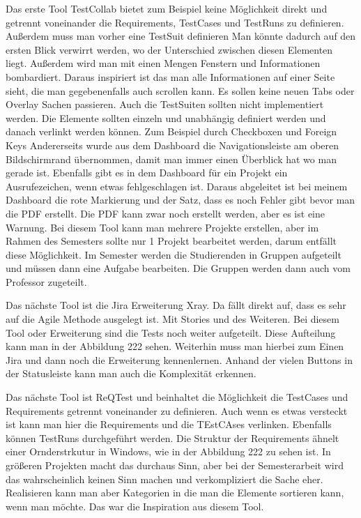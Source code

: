 \documentclass[11pt,a4paper]{report}
\begin{document}
Das erste Tool TestCollab bietet zum Beispiel keine Möglichkeit direkt und getrennt voneinander die Requirements, TestCases und TestRuns zu definieren. Außerdem muss man vorher eine TestSuit definieren
Man könnte dadurch auf den ersten Blick verwirrt werden, wo der Unterschied zwischen diesen Elementen liegt. Außerdem wird man mit einen Mengen Fenstern und Informationen bombardiert. 
Daraus inspiriert ist das man alle Informationen auf einer Seite sieht, die man gegebenenfalls auch scrollen kann. Es sollen keine neuen Tabs oder Overlay Sachen passieren.
Auch die TestSuiten sollten nicht implementiert werden. Die Elemente sollten einzeln und unabhängig definiert werden und danach verlinkt werden können. Zum Beispiel durch Checkboxen und Foreign Keys
Andererseits wurde aus dem Dashboard die Navigationsleiste am oberen Bildschirmrand übernommen, damit man immer einen Überblick hat wo man gerade ist. Ebenfalls gibt es in dem Dashboard für ein Projekt ein Ausrufezeichen, wenn etwas fehlgeschlagen ist. Daraus abgeleitet ist bei meinem Dashboard die rote Markierung und der Satz, dass es noch Fehler gibt bevor man die PDF erstellt. Die PDF kann zwar noch erstellt werden, aber es ist eine Warnung.
Bei diesem Tool kann man mehrere Projekte erstellen, aber im Rahmen des Semesters sollte nur 1 Projekt bearbeitet werden, darum entfällt diese Möglichkeit. Im Semester werden die Studierenden in Gruppen aufgeteilt und müssen dann eine Aufgabe bearbeiten. Die Gruppen werden dann auch vom Professor zugeteilt.


Das nächste Tool ist die Jira Erweiterung Xray. Da fällt direkt auf, dass es sehr auf die Agile Methode ausgelegt ist. Mit Stories und des Weiteren.
Bei diesem Tool oder Erweiterung sind die Tests noch weiter aufgeteilt. Diese Aufteilung kann man in der Abbildung 222 sehen. Weiterhin muss man hierbei zum Einen Jira und dann noch die Erweiterung kennenlernen. Anhand der vielen Buttons in der Statusleiste kann man auch die Komplexität erkennen. 


Das nächste Tool ist ReQTest und beinhaltet die Möglichkeit die TestCases und Requirements getrennt voneinander zu definieren. Auch wenn es etwas versteckt ist kann man hier die Requirements und die TEstCAses verlinken. Ebenfalls können TestRuns durchgeführt werden. Die Struktur der Requirements ähnelt einer Ornderstrkutur in Windows, wie in der Abbildung 222 zu sehen ist. In größeren Projekten macht das durchaus Sinn, aber bei der Semesterarbeit wird das wahrscheinlich keinen Sinn machen und verkompliziert die Sache eher. Realisieren kann man aber Kategorien in die man die Elemente sortieren kann, wenn man möchte. Das war die Inspiration aus diesem Tool. 
\end{document}
